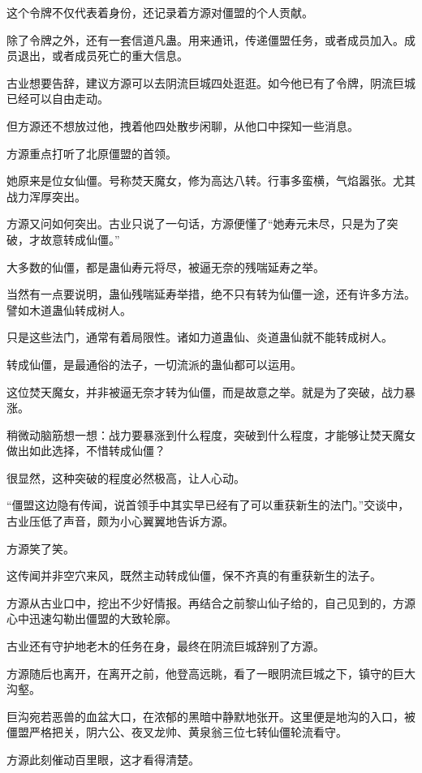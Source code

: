 \begin{this_body}
这个令牌不仅代表着身份，还记录着方源对僵盟的个人贡献。

除了令牌之外，还有一套信道凡蛊。用来通讯，传递僵盟任务，或者成员加入。成员退出，或者成员死亡的重大信息。

古业想要告辞，建议方源可以去阴流巨城四处逛逛。如今他已有了令牌，阴流巨城已经可以自由走动。

但方源还不想放过他，拽着他四处散步闲聊，从他口中探知一些消息。

方源重点打听了北原僵盟的首领。

她原来是位女仙僵。号称焚天魔女，修为高达八转。行事多蛮横，气焰嚣张。尤其战力浑厚突出。

方源又问如何突出。古业只说了一句话，方源便懂了“她寿元未尽，只是为了突破，才故意转成仙僵。”

大多数的仙僵，都是蛊仙寿元将尽，被逼无奈的残喘延寿之举。

当然有一点要说明，蛊仙残喘延寿举措，绝不只有转为仙僵一途，还有许多方法。譬如木道蛊仙转成树人。

只是这些法门，通常有着局限性。诸如力道蛊仙、炎道蛊仙就不能转成树人。

转成仙僵，是最通俗的法子，一切流派的蛊仙都可以运用。

这位焚天魔女，并非被逼无奈才转为仙僵，而是故意之举。就是为了突破，战力暴涨。

稍微动脑筋想一想：战力要暴涨到什么程度，突破到什么程度，才能够让焚天魔女做出如此选择，不惜转成仙僵？

很显然，这种突破的程度必然极高，让人心动。

“僵盟这边隐有传闻，说首领手中其实早已经有了可以重获新生的法门。”交谈中，古业压低了声音，颇为小心翼翼地告诉方源。

方源笑了笑。

这传闻并非空穴来风，既然主动转成仙僵，保不齐真的有重获新生的法子。

方源从古业口中，挖出不少好情报。再结合之前黎山仙子给的，自己见到的，方源心中迅速勾勒出僵盟的大致轮廓。

古业还有守护地老木的任务在身，最终在阴流巨城辞别了方源。

方源随后也离开，在离开之前，他登高远眺，看了一眼阴流巨城之下，镇守的巨大沟壑。

巨沟宛若恶兽的血盆大口，在浓郁的黑暗中静默地张开。这里便是地沟的入口，被僵盟严格把关，阴六公、夜叉龙帅、黄泉翁三位七转仙僵轮流看守。

方源此刻催动百里眼，这才看得清楚。


\end{this_body}
